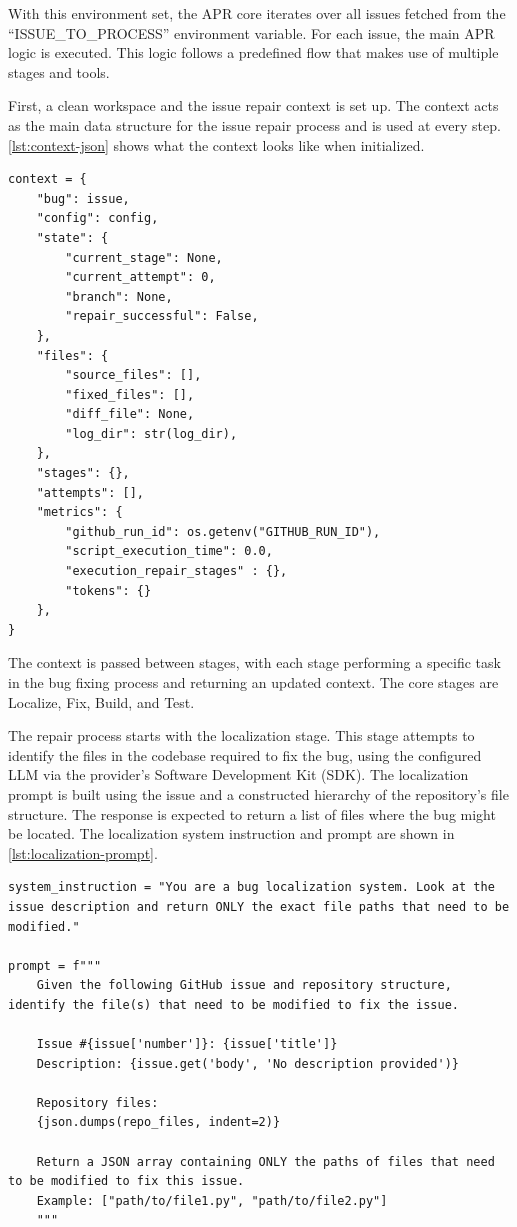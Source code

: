 With this environment set, the APR core iterates over all issues fetched from the ``ISSUE\_TO\_PROCESS'' environment variable. For each issue, the main APR logic is executed. This logic follows a predefined flow that makes use of multiple stages and tools.

First, a clean workspace and the issue repair context is set up. The context acts as the main data structure for the issue repair process and is used at every step. \ref{lst:context-json} shows what the context looks like when initialized.

\begin{lstlisting}[style=json, caption={Context JSON}, label={lst:context-json}]  
context = {
    "bug": issue,
    "config": config,
    "state": {
        "current_stage": None,
        "current_attempt": 0,
        "branch": None,
        "repair_successful": False,
    },
    "files": {
        "source_files": [],
        "fixed_files": [],
        "diff_file": None,
        "log_dir": str(log_dir),
    },
    "stages": {},
    "attempts": [],
    "metrics": {
        "github_run_id": os.getenv("GITHUB_RUN_ID"),
        "script_execution_time": 0.0,
        "execution_repair_stages" : {},
        "tokens": {}
    },
}
\end{lstlisting}

The context is passed between stages, with each stage performing a specific task in the bug fixing process and returning an updated context. The core stages are Localize, Fix, Build, and Test.

The repair process starts with the localization stage. This stage attempts to identify the files in the codebase required to fix the bug, using the configured \ac{LLM} via the provider's Software Development Kit (SDK). The localization prompt is built using the issue and a constructed hierarchy of the repository's file structure. The response is expected to return a list of files where the bug might be located. The localization system instruction and prompt are shown in \ref{lst:localization-prompt}.

\begin{lstlisting}[style=python, caption={Localization Prompt}, label={lst:localization-prompt}]
system_instruction = "You are a bug localization system. Look at the issue description and return ONLY the exact file paths that need to be modified."

prompt = f"""
    Given the following GitHub issue and repository structure, identify the file(s) that need to be modified to fix the issue.

    Issue #{issue['number']}: {issue['title']}
    Description: {issue.get('body', 'No description provided')}

    Repository files:
    {json.dumps(repo_files, indent=2)}

    Return a JSON array containing ONLY the paths of files that need to be modified to fix this issue.
    Example: ["path/to/file1.py", "path/to/file2.py"]
    """
\end{lstlisting}

